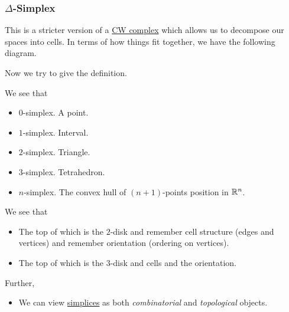 \subsubsection{\(\Delta\)-Simplex}
This is a stricter version of a \hyperref[def:CW-Complex]{CW complex} which allows us to decompose our spaces into cells. In terms of how things fit together, we have
the following diagram.
\begin{figure}[H]
	\centering
	\label{fig:simplicial-homology-venn-diagram}
\end{figure}

Now we try to give the definition.
\begin{definition}[Simplex]\label{def:simplex}
	We see that
	\begin{itemize}
		\item \(0\)-simplex. A point.
		\item \(1\)-simplex. Interval.
		\item \(2\)-simplex. Triangle.
		\item \(3\)-simplex. Tetrahedron.
		\item \(n\)-simplex. The convex hull of \((n+1)\)-points position in \(\mathbb{\MakeUppercase{r}} ^n\).
	\end{itemize}
	\begin{figure}[H]
		\centering
		\label{fig:def:simplex}
	\end{figure}
\end{definition}
\begin{remark}
	We see that
	\begin{itemize}
		\item The top of which is the \(2\)-disk and remember cell structure (edges and vertices) and remember orientation (ordering on vertices).
		\item The top of which is the \(3\)-disk and cells and the orientation.
	\end{itemize}
	Further,
	\begin{itemize}
		\item We can view \hyperref[def:simplex]{simplices} as both \emph{combinatorial} and \emph{topological} objects.
	\end{itemize}
\end{remark}

